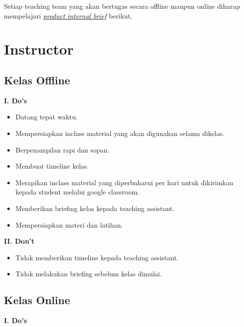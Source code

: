 \documentclass[
]{book}
\providecommand{\tightlist}{%
  \setlength{\itemsep}{0pt}\setlength{\parskip}{0pt}}
\begin{document}
Setiap teaching team yang akan bertugas secara offline maupun online diharap mempelajari \href{https://docs.google.com/presentation/d/17f0z3x9RhJCjarY1yY3vWyW23kr-gSHHhTNdtd97BnM/edit?usp=sharing}{\emph{product internal brief}} berikut.

\hypertarget{instructor}{%
\section{Instructor}\label{instructor}}

\hypertarget{kelas-offline-3}{%
\subsection{Kelas Offline}\label{kelas-offline-3}}

\textbf{I. Do's}

\begin{itemize}
\tightlist
\item
  Datang tepat waktu.
\item
  Mempersiapkan inclass material yang akan digunakan selama dikelas.
\item
  Berpenampilan rapi dan sopan.
\item
  Membuat timeline kelas.
\item
  Merapikan inclass material yang diperbaharui per hari untuk dikirimkan kepada student melalui google classroom.
\item
  Memberikan briefing kelas kepada teaching assistant.
\item
  Mempersiapkan materi dan latihan.
\end{itemize}

\textbf{II. Don't}

\begin{itemize}
\tightlist
\item
  Tidak memberikan timeline kepada teaching assistant.
\item
  Tidak melakukan briefing sebelum kelas dimulai.
\end{itemize}

\hypertarget{kelas-online-3}{%
\subsection{Kelas Online}\label{kelas-online-3}}

\textbf{I. Do's}
\end{document}
